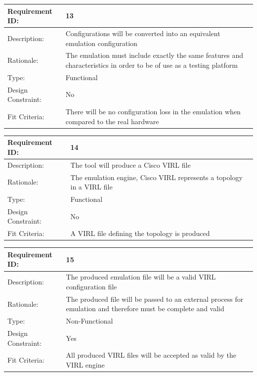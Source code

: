 \documentclass[11pt]{report}
\begin{document}
\newline
\vspace*{0.5 cm}
\newline
\begin{tabular}{|l|p{12cm}|}
	\hline Requirement ID: & 13 \\ 
	\hline Description: & Configurations will be converted into an equivalent emulation configuration \\ 
	\hline Rationale: & The emulation must include exactly the same features and characteristics in order to be of use as a testing platform \\ 
	\hline Type: & Functional \\ 
	\hline Design Constraint: & No \\ 
	\hline Fit Criteria: & There will be no configuration loss in the emulation when compared to the real hardware \\ 
	\hline 
\end{tabular}
\newline
\vspace*{0.5 cm}
\newline
\begin{tabular}{|l|p{12cm}|}
	\hline Requirement ID: & 14 \\ 
	\hline Description: & The tool will produce a Cisco VIRL file  \\ 
	\hline Rationale: & The emulation engine, Cisco VIRL represents a topology in a VIRL file \\ 
	\hline Type: & Functional \\ 
	\hline Design Constraint: & No \\ 
	\hline Fit Criteria: & A VIRL file defining the topology is produced \\ 
	\hline 
\end{tabular}
\newline
\vspace*{0.5 cm}
\newline
\begin{tabular}{|l|p{12cm}|}
	\hline Requirement ID: & 15 \\ 
	\hline Description: & The produced emulation file will be a valid VIRL configuration file  \\ 
	\hline Rationale: & The produced file will be passed to an external process for emulation and therefore must be complete and valid \\ 
	\hline Type: & Non-Functional \\ 
	\hline Design Constraint: & Yes \\ 
	\hline Fit Criteria: & All produced VIRL files will be accepted as valid by the VIRL engine \\ 
	\hline 
\end{tabular}
\end{document}

